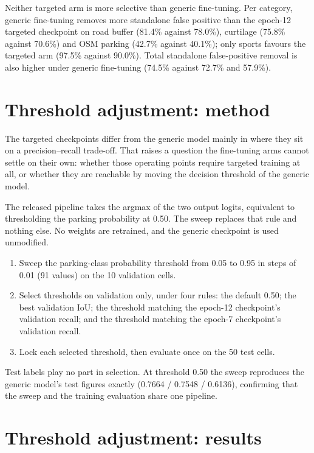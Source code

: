 Neither targeted arm is more selective than generic fine-tuning. Per category, generic fine-tuning removes more standalone false positive than the epoch-12 targeted checkpoint on road buffer (81.4\% against 78.0\%), curtilage (75.8\% against 70.6\%) and OSM parking (42.7\% against 40.1\%); only sports favours the targeted arm (97.5\% against 90.0\%). Total standalone false-positive removal is also higher under generic fine-tuning (74.5\% against 72.7\% and 57.9\%).

\hypertarget{threshold-adjustment-method}{%
\section{Threshold adjustment: method}\label{threshold-adjustment-method}}

The targeted checkpoints differ from the generic model mainly in where they sit on a precision--recall trade-off. That raises a question the fine-tuning arms cannot settle on their own: whether those operating points require targeted training at all, or whether they are reachable by moving the decision threshold of the generic model.

The released pipeline takes the argmax of the two output logits, equivalent to thresholding the parking probability at 0.50. The sweep replaces that rule and nothing else. No weights are retrained, and the generic checkpoint is used unmodified.

\begin{enumerate}
\def\labelenumi{\arabic{enumi}.}
\tightlist
\item
  Sweep the parking-class probability threshold from 0.05 to 0.95 in steps of 0.01 (91 values) on the 10 validation cells.
\item
  Select thresholds on validation only, under four rules: the default 0.50; the best validation IoU; the threshold matching the epoch-12 checkpoint's validation recall; and the threshold matching the epoch-7 checkpoint's validation recall.
\item
  Lock each selected threshold, then evaluate once on the 50 test cells.
\end{enumerate}

Test labels play no part in selection. At threshold 0.50 the sweep reproduces the generic model's test figures exactly (0.7664 / 0.7548 / 0.6136), confirming that the sweep and the training evaluation share one pipeline.

\hypertarget{threshold-adjustment-results}{%
\section{Threshold adjustment: results}\label{threshold-adjustment-results}}

